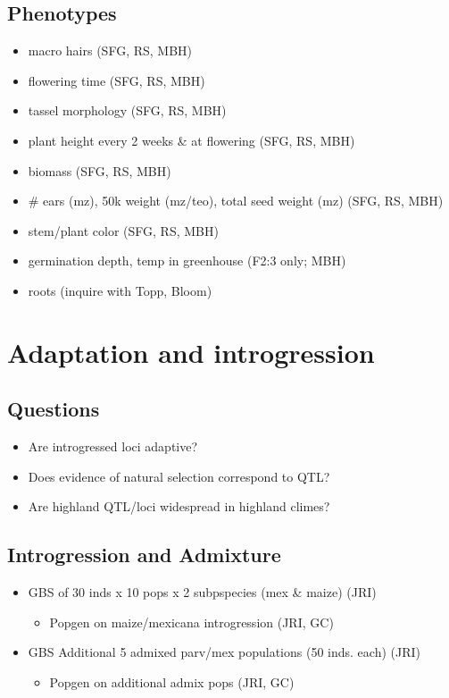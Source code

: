 \documentclass[]{article}
\begin{document}
\subsection{ Phenotypes }
		\begin{itemize}
			\item macro hairs (SFG, RS, MBH)
			\item flowering time  (SFG, RS, MBH)
			\item tassel morphology  (SFG, RS, MBH)
			\item plant height every 2 weeks \& at flowering  (SFG, RS, MBH)
			\item biomass  (SFG, RS, MBH)
			\item \# ears (mz), 50k weight (mz/teo), total seed weight (mz)  (SFG, RS, MBH)
			\item stem/plant color  (SFG, RS, MBH)
			\item germination depth, temp in greenhouse (F2:3 only; MBH)
			\item roots (inquire with Topp, Bloom) 
	\end{itemize}

\section{Adaptation and introgression}

\subsection{Questions}
	\begin{itemize}	
		\item Are introgressed loci adaptive? 
		\item Does evidence of natural selection correspond to QTL? 
		\item Are highland QTL/loci widespread in highland climes? 
	\end{itemize}	
\subsection{ Introgression and Admixture  }
	\begin{itemize}	
		\item GBS of 30 inds x 10 pops x 2 subpspecies (mex \& maize) (JRI)
			\begin{itemize}	
				\item Popgen on maize/mexicana introgression (JRI, GC)
			\end{itemize}

		\item GBS Additional 5 admixed parv/mex populations (50 inds. each) (JRI)
			\begin{itemize}	
				\item Popgen on additional admix pops (JRI, GC)
			\end{itemize}

	\end{itemize}
\end{document}

